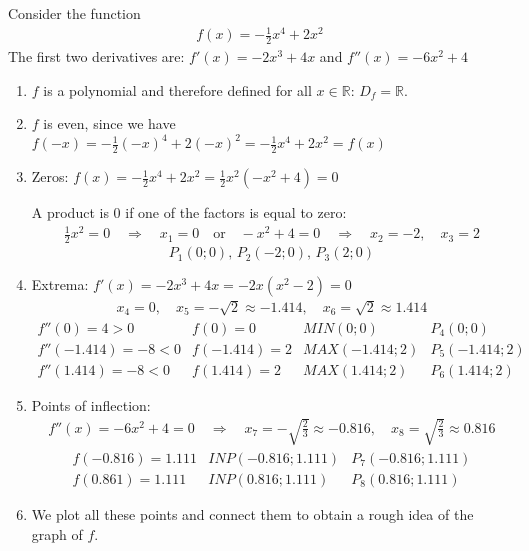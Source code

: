 \documentclass[12pt,eng]{skript_ogg}
\begin{document}
\begin{beispiel}
Consider the function 
\begin{align*}
f(x)=-\frac{1}{2}x^4+2x^2
\end{align*}
The first two derivatives are: $f'(x)=-2x^3+4x$ and $f''(x)=-6x^2+4$
\begin{enumerate}
\setlength{\itemsep}{-0.5ex}
\item $f$ is a polynomial and therefore defined for all $x\in \mathbb{R}$: $D_f=\mathbb{R}$.
\item $f$ is even, since we have $f(-x)=-\frac{1}{2}(-x)^4+2(-x)^2=-\frac{1}{2}x^4+2x^2=f(x)$
\item Zeros: $f(x)=-\frac{1}{2}x^4+2x^2=\frac{1}{2}x^2(-x^2+4)=0$

A product is 0 if one of the factors is equal to zero:
\begin{align*}
\frac{1}{2}x^2=0 \quad \Rightarrow \quad x_1=0\quad\mbox{or}\quad-x^2+4=0 \quad \Rightarrow \quad x_2=-2,\quad x_3=2
\end{align*}
\[P_1(0;0),\,P_2(-2;0),\,P_3(2;0)\]
\item Extrema: $f'(x)=-2x^3+4x=-2x(x^2-2)=0$
\begin{align*}
x_4=0, \quad x_5=-\sqrt{2}\approx-1.414,\quad x_6=\sqrt{2}\approx1.414
\end{align*}
\[\begin{array}{llll}
f''(0)=4>0 & f(0)=0 & MIN(0;0) & P_4(0;0)\\
f''(-1.414)=-8<0 & f(-1.414)=2 & MAX(-1.414;2) & P_5(-1.414;2)\\
f''(1.414)=-8<0 & f(1.414)=2 & MAX(1.414;2) & P_6(1.414;2)
\end{array}\]
\item Points of inflection:
\begin{align*}
f''(x)=-6x^2+4=0 \quad \Rightarrow \quad x_7=-\sqrt{\frac{2}{3}}\approx-0.816,\quad x_8=\sqrt{\frac{2}{3}}\approx0.816
\end{align*}
\[\begin{array}{lll}
f(-0.816)=1.111 & INP(-0.816;1.111) & P_7(-0.816;1.111)\\
f(0.861)=1.111 & INP(0.816;1.111) & P_8(0.816;1.111)
\end{array}\]
\item We plot all these points and connect them to obtain a rough idea of the graph of $f$.

\vspace{-3mm}


\end{enumerate}
\end{beispiel}
\end{document}
